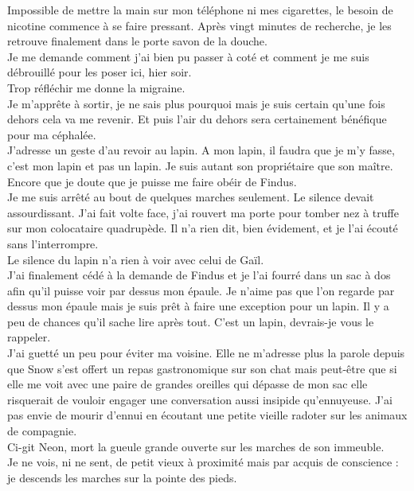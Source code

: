 Impossible de mettre la main sur mon téléphone ni mes cigarettes, le besoin de nicotine commence à se faire pressant. Après vingt minutes de recherche, je les retrouve finalement dans le porte savon de la douche. \\
Je me demande comment j'ai bien pu passer à coté et comment je me suis débrouillé pour les poser ici, hier soir. \\
Trop réfléchir me donne la migraine. \\

Je m’apprête à sortir, je ne sais plus pourquoi mais je suis certain qu'une fois dehors cela va me revenir. Et puis l'air du dehors sera certainement bénéfique pour ma céphalée. \\
J'adresse un geste d'au revoir au lapin. A mon lapin, il faudra que je m'y fasse, c'est mon lapin et pas un lapin. Je suis autant son propriétaire que son maître. Encore que je doute que je puisse me faire obéir de Findus. \\

Je me suis arrêté au bout de quelques marches seulement. Le silence devait assourdissant. J'ai fait volte face, j'ai rouvert ma porte pour tomber nez à truffe sur mon colocataire quadrupède. Il n'a rien dit, bien évidement, et je l'ai écouté sans l’interrompre. \\
Le silence du lapin n'a rien à voir avec celui de Gaïl. \\

J'ai finalement cédé à la demande de Findus et je l'ai fourré dans un sac à dos afin qu'il puisse voir par dessus mon épaule. Je n'aime pas que l'on regarde par dessus mon épaule mais je suis prêt à faire une exception pour un lapin. Il y a peu de chances qu'il sache lire après tout. C'est un lapin, devrais-je vous le rappeler. \\

J'ai guetté un peu pour éviter ma voisine. Elle ne m'adresse plus la parole depuis que Snow s'est offert un repas gastronomique sur son chat mais peut-être que si elle me voit avec une paire de grandes oreilles qui dépasse de mon sac elle risquerait de vouloir engager une conversation aussi insipide qu'ennuyeuse. J'ai pas envie de mourir d'ennui en écoutant une petite vieille radoter sur les animaux de compagnie. \\
Ci-git Neon, mort la gueule grande ouverte sur les marches de son immeuble.\\
Je ne vois, ni ne sent, de petit vieux à proximité mais par acquis de conscience : je descends les marches sur la pointe des pieds. \\

